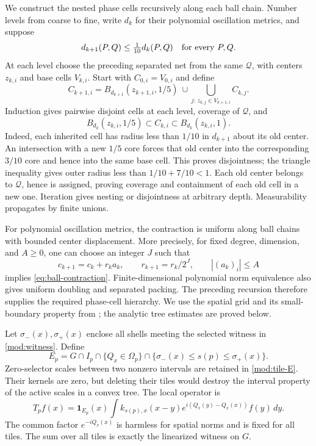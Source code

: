 \documentclass[11pt]{article}
\numberwithin{equation}{section}
\theoremstyle{remark}
\theoremstyle{definition}
\begin{document}
We construct the nested phase cells recursively along each ball chain.
Number levels from coarse to fine, write $d_k$ for their polynomial
oscillation metrics, and suppose
\begin{equation}\label{eq:ball-contraction}
 d_{k+1}(P,Q)\le\tfrac1{10}d_k(P,Q)\quad\hbox{for every }P,Q.
\end{equation}
At each level choose the preceding separated net from the same
$\mathcal Q$, with centers $z_{k,i}$ and base cells $V_{k,i}$. Start with
$C_{0,i}=V_{0,i}$ and define
\begin{equation}\label{eq:ambient-refinement}
 C_{k+1,i}=B_{d_{k+1}}(z_{k+1,i},1/5)
 \ \cup\!\!\bigcup_{j:\,z_{k,j}\in V_{k+1,i}} C_{k,j}.
\end{equation}
Induction gives pairwise disjoint cells at each level, coverage of
$\mathcal Q$, and
\[
 B_{d_k}(z_{k,i},1/5)\subset C_{k,i}\subset B_{d_k}(z_{k,i},1).
\]
Indeed, each inherited cell has radius less than $1/10$ in $d_{k+1}$
about its old center. An intersection with a new $1/5$ core forces that
old center into the corresponding $3/10$ core and hence into the same
base cell. This proves disjointness; the triangle inequality gives
outer radius less than $1/10+7/10<1$. Each old center belongs to
$\mathcal Q$, hence is assigned, proving coverage and containment of
each old cell in a new one. Iteration gives nesting or disjointness at
arbitrary depth. Measurability propagates by finite unions.

For polynomial oscillation metrics, the contraction is uniform along
ball chains with bounded center displacement. More precisely, for fixed
degree, dimension, and $A\ge0$, one can choose an integer $J$ such that
\[
 c_{k+1}=c_k+r_k a_k,\qquad
 r_{k+1}=r_k/2^J,\qquad |(a_k)_i|\le A
\]
implies \eqref{eq:ball-contraction}. Finite-dimensional polynomial
norm equivalence also gives uniform doubling and separated packing.
The preceding recursion therefore supplies the required phase-cell
hierarchy. We use the spatial grid and its small-boundary property from
\cite{BDJST}; the analytic tree estimates are proved below.

Let $\sigma_-(x),\sigma_+(x)$ enclose all shells meeting the selected
witness in \eqref{mod:witness}. Define
\begin{equation}\label{mod:tile-E}
 E_p=G\cap I_p\cap\{Q_x\in\Omega_p\}
       \cap\{\sigma_-(x)\le s(p)\le\sigma_+(x)\}.
\end{equation}
Zero-selector scales between two nonzero intervals are retained in
\eqref{mod:tile-E}. Their kernels are zero, but deleting their tiles would
destroy the interval property of the active scales in a convex tree.
The local operator is
\begin{equation}\label{mod:tile-op}
 T_pf(x)=\mathbf1_{E_p}(x)
 \int k_{s(p),x}(x-y)e^{i(Q_x(y)-Q_x(x))}f(y)\,dy.
\end{equation}
The common factor $e^{-iQ_x(x)}$ is harmless for spatial norms and is
fixed for all tiles. The sum over all tiles is exactly the linearized
witness on $G$.
\end{document}
